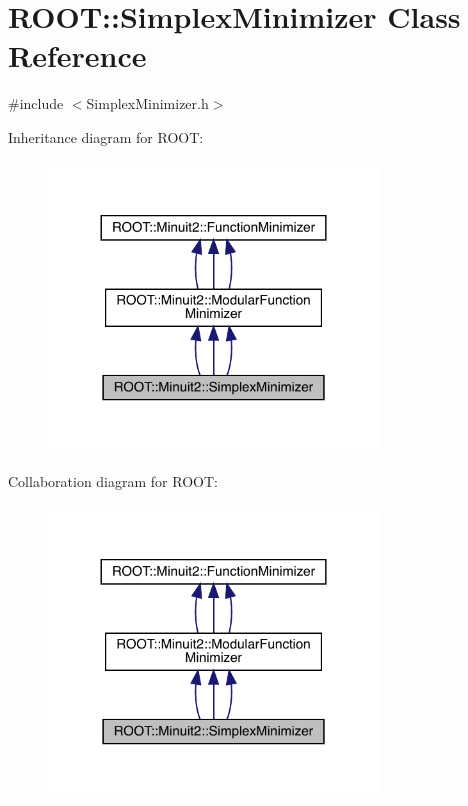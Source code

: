 \hypertarget{classROOT_1_1Minuit2_1_1SimplexMinimizer}{}\section{R\+O\+OT\+:\+:Simplex\+Minimizer Class Reference}
\label{classROOT_1_1Minuit2_1_1SimplexMinimizer}


{\ttfamily \#include $<$Simplex\+Minimizer.\+h$>$}



Inheritance diagram for R\+O\+OT\+:
\nopagebreak
\begin{figure}[H]
\begin{center}
\leavevmode
\includegraphics[width=248pt]{d4/d74/classROOT_1_1Minuit2_1_1SimplexMinimizer__inherit__graph}
\end{center}
\end{figure}


Collaboration diagram for R\+O\+OT\+:
\nopagebreak
\begin{figure}[H]
\begin{center}
\leavevmode
\includegraphics[width=248pt]{d7/d74/classROOT_1_1Minuit2_1_1SimplexMinimizer__coll__graph}
\end{center}
\end{figure}
